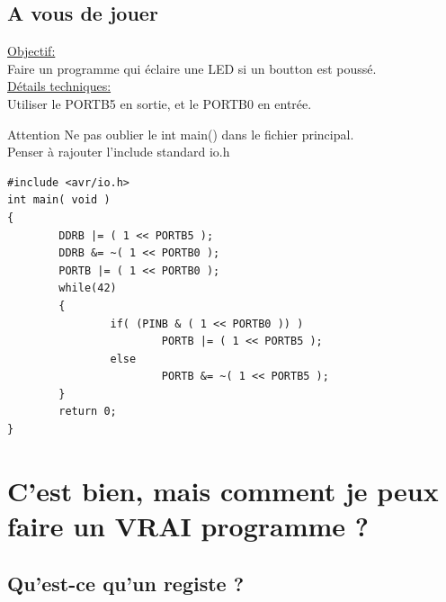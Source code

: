 \documentclass{beamer}
\begin{document}
\subsection{A vous de jouer}

\begin{frame}
  \underline{Objectif:}\\
  Faire un programme qui \'eclaire une LED si un boutton est pouss\'e.\\
  \pause
  \underline{D\'etails techniques:}\\
  Utiliser le PORTB5 en sortie, et le PORTB0 en entr\'ee.
  \pause
  \begin{alertblock}{Attention}
    Ne pas oublier le int main() dans le fichier principal.\\
    Penser \`a rajouter l'include standard io.h
  \end{alertblock}
\end{frame}

\lstset{language=c++} 
\lstset{commentstyle=\textit} 
\begin{lstlisting}
#include <avr/io.h>
int main( void )
{
        DDRB |= ( 1 << PORTB5 );
        DDRB &= ~( 1 << PORTB0 );
        PORTB |= ( 1 << PORTB0 );
        while(42)
        {
                if( (PINB & ( 1 << PORTB0 )) )
                        PORTB |= ( 1 << PORTB5 );
                else
                        PORTB &= ~( 1 << PORTB5 );
        }
        return 0;
}
\end{lstlisting} 

\section{C'est bien, mais comment je peux faire un VRAI programme ?}

\begin{frame}
  \tableofcontents[currentsection]
\end{frame}

\subsection{Qu'est-ce qu'un registe ?}
\end{document}

